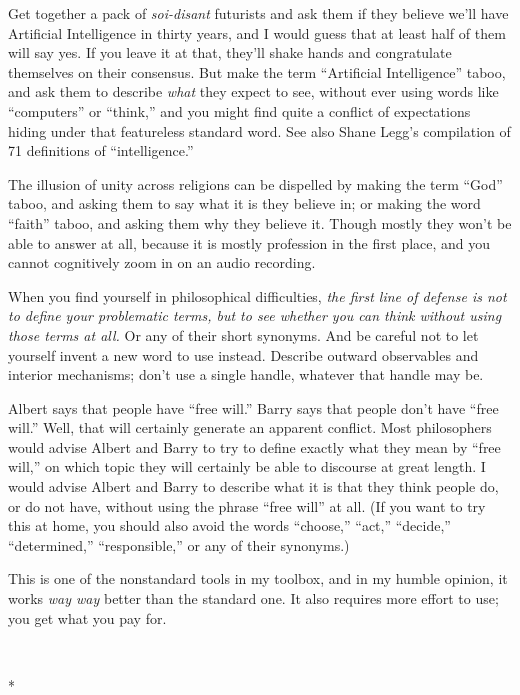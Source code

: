 {
 Get together a pack of \textit{soi-disant} futurists and ask them
if they believe we'll have Artificial Intelligence in
thirty years, and I would guess that at least half of them will say
yes. If you leave it at that, they'll shake hands and
congratulate themselves on their consensus. But make the term
``Artificial Intelligence'' taboo,
and ask them to describe \textit{what} they expect to see, without ever
using words like ``computers'' or
``think,'' and you might find quite
a conflict of expectations hiding under that featureless standard word.
See also Shane Legg's compilation of 71 definitions of
``intelligence.''}

{
 The illusion of unity across religions can be dispelled by making
the term ``God'' taboo, and asking
them to say what it is they believe in; or making the word
``faith'' taboo, and asking them why
they believe it. Though mostly they won't be able to
answer at all, because it is mostly profession in the first place, and
you cannot cognitively zoom in on an audio recording.}

{
 When you find yourself in philosophical difficulties, \textit{the
first line of defense is not to define your problematic terms, but to
see whether you can think without using those terms at all.} Or any of
their short synonyms. And be careful not to let yourself invent a new
word to use instead. Describe outward observables and interior
mechanisms; don't use a single handle, whatever that
handle may be.}

{
 Albert says that people have ``free
will.'' Barry says that people don't
have ``free will.'' Well, that will
certainly generate an apparent conflict. Most philosophers would advise
Albert and Barry to try to define exactly what they mean by
``free will,'' on which topic they
will certainly be able to discourse at great length. I would advise
Albert and Barry to describe what it is that they think people do, or
do not have, without using the phrase ``free
will'' at all. (If you want to try this at home, you
should also avoid the words
``choose,''
``act,''
``decide,''
``determined,''
``responsible,'' or any of their
synonyms.)}

{
 This is one of the nonstandard tools in my toolbox, and in my
humble opinion, it works \textit{way way} better than the standard one.
It also requires more effort to use; you get what you pay for.}

{\centering
 \ ~
\par}

{\centering
 *
\par}

